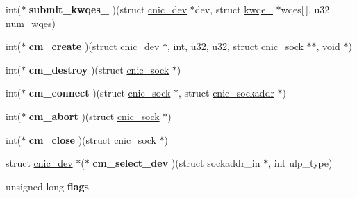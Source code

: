 \begin{DoxyCompactItemize}
\item 
\hypertarget{structcnic__dev_a755ee5f99599c5631bf0910346dd8d99}{
int($\ast$ {\bfseries submit\_\-kwqes\_} )(struct \hyperlink{structcnic__dev}{cnic\_\-dev} $\ast$dev, struct \hyperlink{structkwqe__16}{kwqe\_} $\ast$wqes\mbox{[}$\,$\mbox{]}, u32 num\_\-wqes)}
\label{structcnic__dev_a755ee5f99599c5631bf0910346dd8d99}

\item 
\hypertarget{structcnic__dev_a342bf6a80c4f356a42efc34926744ff8}{
int($\ast$ {\bfseries cm\_\-create} )(struct \hyperlink{structcnic__dev}{cnic\_\-dev} $\ast$, int, u32, u32, struct \hyperlink{structcnic__sock}{cnic\_\-sock} $\ast$$\ast$, void $\ast$)}
\label{structcnic__dev_a342bf6a80c4f356a42efc34926744ff8}

\item 
\hypertarget{structcnic__dev_aa00003ed341030a0904a8ae4a48b9953}{
int($\ast$ {\bfseries cm\_\-destroy} )(struct \hyperlink{structcnic__sock}{cnic\_\-sock} $\ast$)}
\label{structcnic__dev_aa00003ed341030a0904a8ae4a48b9953}

\item 
\hypertarget{structcnic__dev_a233ae406b801429b0310612515e3f4c2}{
int($\ast$ {\bfseries cm\_\-connect} )(struct \hyperlink{structcnic__sock}{cnic\_\-sock} $\ast$, struct \hyperlink{structcnic__sockaddr}{cnic\_\-sockaddr} $\ast$)}
\label{structcnic__dev_a233ae406b801429b0310612515e3f4c2}

\item 
\hypertarget{structcnic__dev_a1ec1726d6caee14f4bc61f9a42c693d6}{
int($\ast$ {\bfseries cm\_\-abort} )(struct \hyperlink{structcnic__sock}{cnic\_\-sock} $\ast$)}
\label{structcnic__dev_a1ec1726d6caee14f4bc61f9a42c693d6}

\item 
\hypertarget{structcnic__dev_a9c4a8e89f8b9717ed7211c8d3c6b1a03}{
int($\ast$ {\bfseries cm\_\-close} )(struct \hyperlink{structcnic__sock}{cnic\_\-sock} $\ast$)}
\label{structcnic__dev_a9c4a8e89f8b9717ed7211c8d3c6b1a03}

\item 
\hypertarget{structcnic__dev_a0cb585a4e9100d08cbadcd14ef9d3aa3}{
struct \hyperlink{structcnic__dev}{cnic\_\-dev} $\ast$($\ast$ {\bfseries cm\_\-select\_\-dev} )(struct sockaddr\_\-in $\ast$, int ulp\_\-type)}
\label{structcnic__dev_a0cb585a4e9100d08cbadcd14ef9d3aa3}

\item 
\hypertarget{structcnic__dev_a8e81bf1cb75970f313fa6c5758bd5a0e}{
unsigned long {\bfseries flags}}
\label{structcnic__dev_a8e81bf1cb75970f313fa6c5758bd5a0e}


\end{DoxyCompactItemize}
